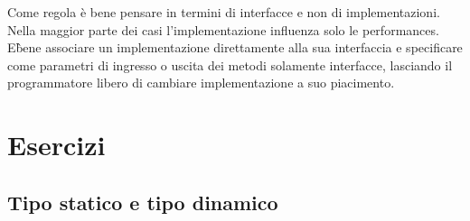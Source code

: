 \documentclass{article}
\begin{document}
\begin{framed}
Come regola \`e bene pensare in termini di interfacce e non di implementazioni. Nella maggior parte dei casi l'implementazione influenza solo le performances. E\` bene associare un implementazione direttamente alla sua interfaccia e specificare come parametri di ingresso o uscita dei metodi solamente interfacce, lasciando il programmatore libero di cambiare implementazione a suo piacimento. 
\end{framed}




\section{Esercizi}

\subsection{Tipo statico e tipo dinamico}
\end{document}
